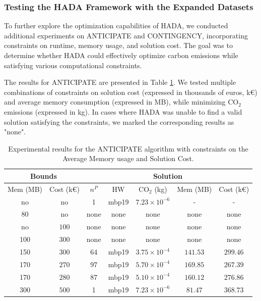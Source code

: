 \documentclass[a4paper,singleside,12pt]{report} %
\begin{document}
\subsubsection{Testing the HADA Framework with the Expanded Datasets}

To further explore the optimization capabilities of HADA, we conducted additional experiments on ANTICIPATE and CONTINGENCY, incorporating constraints on runtime, memory usage, and 
solution cost. The goal was to determine whether HADA could effectively optimize carbon emissions while satisfying various computational constraints. 

The results for ANTICIPATE are presented in Table \ref{tab:anticipate_results}. We tested multiple combinations of constraints on solution cost (expressed in thousands of euros, k€) and 
average memory consumption (expressed in MB), while minimizing CO$_2$ emissions (expressed in kg). In cases where HADA was unable to find a valid solution satisfying the constraints, we 
marked the corresponding results as "none".

\begin{table}[h!]
    \centering
    \begin{tabular}{|cc|ccccc|}
        \hline
        \multicolumn{2}{|c|}{Bounds} & \multicolumn{5}{c|}{Solution} \\
        \hline
        Mem (MB) & Cost (k€) & $n^P$ & HW & CO$_2$ (kg) & Mem (MB) & Cost (k€) \\
        \hline
        no & no & 1 & mbp19 & $7.23 \times 10^{-6}$ & - & - \\
        80 & no & none & none & none & none & none \\
        no & $100$ & none & none & none & none & none \\
        100 & $300$ & none & none & none & none & none \\
        150 & $300$ & 64 & mbp19 & $3.75 \times 10^{-4}$ & $141.53$ & $299.46$ \\
        170 & $270$ & 97 & mbp19 & $5.70 \times 10^{-4}$ & $169.85$ & $267.39$ \\
        170 & $280$ & 87 & mbp19 & $5.10 \times 10^{-4}$ & $160.12$ & $276.86$ \\
        300 & $500$ & 1 & mbp19 & $7.23 \times 10^{-6}$ & $81.47$ & $368.73$ \\
        \hline
    \end{tabular}
    \caption{Experimental results for the ANTICIPATE algorithm with constraints on the Average Memory usage and Solution Cost.}
    \label{tab:anticipate_results}
\end{table}
\end{document}
